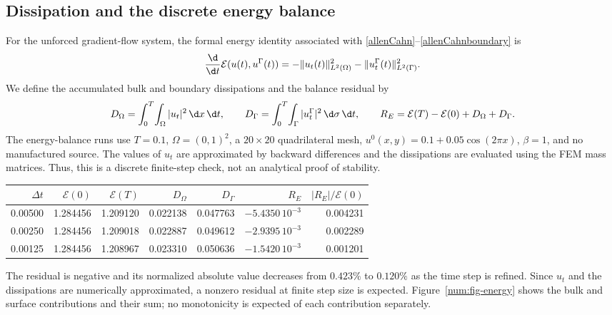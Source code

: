 \subsection{Dissipation and the discrete energy balance}
For the unforced gradient-flow system, the formal energy identity associated with \eqref{allenCahn}--\eqref{allenCahnboundary} is
\begin{equation}
\label{num:formal-dissipation}
\frac{\d}{\d t}\mathcal E(u(t),u^\Gamma(t))
=-\|u_t(t)\|_{L^2(\Omega)}^2-\|u_t^\Gamma(t)\|_{L^2(\Gamma)}^2.
\end{equation}
We define the accumulated bulk and boundary dissipations and the balance residual by
\begin{equation}
\label{num:balance}
D_\Omega=\int_0^T\!\int_\Omega|u_t|^2\,\d x\,\d t,\qquad
D_\Gamma=\int_0^T\!\int_\Gamma|u_t^\Gamma|^2\,\d\sigma\,\d t,\qquad
R_E=\mathcal E(T)-\mathcal E(0)+D_\Omega+D_\Gamma.
\end{equation}
The energy-balance runs use $T=0.1$, $\Omega=(0,1)^2$, a $20\times20$ quadrilateral mesh, $u^0(x,y)=0.1+0.05\cos(2\pi x)$, $\beta=1$, and no manufactured source. The values of $u_t$ are approximated by backward differences and the dissipations are evaluated using the FEM mass matrices. Thus, this is a discrete finite-step check, not an analytical proof of stability.
\begin{center}\small
\begin{tabular}{rrrrrrr}
\hline
$\Delta t$&$\mathcal E(0)$&$\mathcal E(T)$&$D_\Omega$&$D_\Gamma$&$R_E$&$|R_E|/\mathcal E(0)$\\
\hline
0.00500&1.284456&1.209120&0.022138&0.047763&$-5.4350\,10^{-3}$&0.004231\\
0.00250&1.284456&1.209018&0.022887&0.049612&$-2.9395\,10^{-3}$&0.002289\\
0.00125&1.284456&1.208967&0.023310&0.050636&$-1.5420\,10^{-3}$&0.001201\\
\hline
\end{tabular}
\end{center}
The residual is negative and its normalized absolute value decreases from $0.423\%$ to $0.120\%$ as the time step is refined. Since $u_t$ and the dissipations are numerically approximated, a nonzero residual at finite step size is expected. Figure~\ref{num:fig-energy} shows the bulk and surface contributions and their sum; no monotonicity is expected of each contribution separately.

